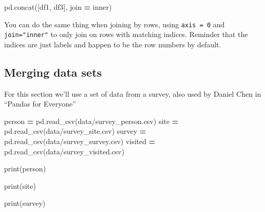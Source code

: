 \documentclass[
  letterpaper,
]{scrbook}
\newenvironment{Shaded}{\begin{snugshade}}{\end{snugshade}}
\newcommand{\BuiltInTok}[1]{#1}
\newcommand{\NormalTok}[1]{#1}
\newcommand{\OperatorTok}[1]{\textcolor[rgb]{0.81,0.36,0.00}{\textbf{#1}}}
\newcommand{\StringTok}[1]{\textcolor[rgb]{0.31,0.60,0.02}{#1}}
\begin{document}
\begin{Shaded}
\begin{Highlighting}[]
\NormalTok{pd.concat([df1, df3], join }\OperatorTok{=} \StringTok{\textquotesingle{}inner\textquotesingle{}}\NormalTok{)}
\end{Highlighting}
\end{Shaded}

You can do the same thing when joining by rows, using \texttt{axis\ =\ 0} and \texttt{join="inner"} to only join on rows with matching indices. Reminder that the indices are just labels and happen to be the row numbers by default.

\hypertarget{merging-data-sets}{%
\subsection{Merging data sets}\label{merging-data-sets}}

For this section we'll use a set of data from a survey, also used by Daniel Chen in ``Pandas for Everyone''

\begin{Shaded}
\begin{Highlighting}[]
\NormalTok{person }\OperatorTok{=}\NormalTok{ pd.read\_csv(}\StringTok{\textquotesingle{}data/survey\_person.csv\textquotesingle{}}\NormalTok{)}
\NormalTok{site }\OperatorTok{=}\NormalTok{ pd.read\_csv(}\StringTok{\textquotesingle{}data/survey\_site.csv\textquotesingle{}}\NormalTok{)}
\NormalTok{survey }\OperatorTok{=}\NormalTok{ pd.read\_csv(}\StringTok{\textquotesingle{}data/survey\_survey.csv\textquotesingle{}}\NormalTok{)}
\NormalTok{visited }\OperatorTok{=}\NormalTok{ pd.read\_csv(}\StringTok{\textquotesingle{}data/survey\_visited.csv\textquotesingle{}}\NormalTok{)}
\end{Highlighting}
\end{Shaded}

\begin{Shaded}
\begin{Highlighting}[]
\BuiltInTok{print}\NormalTok{(person)}
\end{Highlighting}
\end{Shaded}

\begin{Shaded}
\begin{Highlighting}[]
\BuiltInTok{print}\NormalTok{(site)}
\end{Highlighting}
\end{Shaded}

\begin{Shaded}
\begin{Highlighting}[]
\BuiltInTok{print}\NormalTok{(survey)}
\end{Highlighting}
\end{Shaded}
\end{document}

